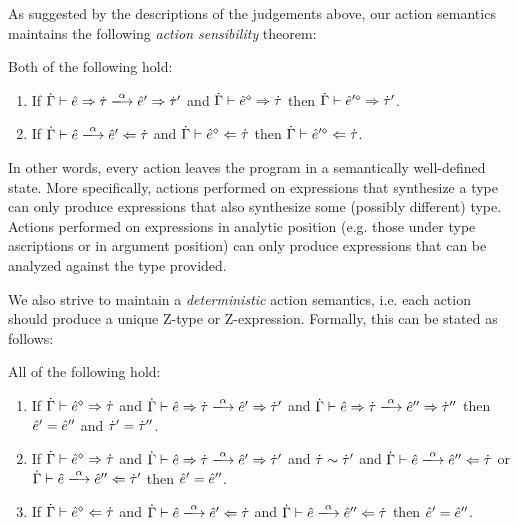 \documentclass{llncs}
\begin{document}
As suggested by the descriptions of the judgements above, our action semantics maintains the following \emph{action sensibility} theorem:
\begin{theorem} Both of the following hold:
\label{thrm:actsafe}
\begin{enumerate}
\item If $\performSyn{\hGamma}{\zexp}{\htau}{\alpha}{\zexp'}{\htau'}$ and $\dot{\Gamma} \vdash \hat{e}^{\diamond} \Rightarrow \dot{\tau}$ then $\dot{\Gamma} \vdash \hat{e}'^{\diamond} \Rightarrow \dot{\tau}'$.
\item If $\performAna{\hGamma}{\zexp}{\htau}{\alpha}{\zexp'}$ and $\dot{\Gamma} \vdash \hat{e}^{\diamond} \Leftarrow \dot{\tau}$ then $\dot{\Gamma} \vdash \hat{e}'^{\diamond} \Leftarrow \dot{\tau}$.
\end{enumerate}
\end{theorem}

In other words, every action leaves the program in a semantically well-defined state. More specifically, actions performed on expressions that synthesize a type can only produce expressions that also synthesize some (possibly different) type. Actions performed on expressions in analytic position (e.g. those under type ascriptions or in argument position) can only produce expressions that can be analyzed against the type provided.%

We also strive to maintain a \emph{deterministic} action semantics, i.e. each action should produce a unique Z-type or Z-expression. Formally, this can be stated as follows:
\begin{theorem} All of the following hold:
\label{thrm:actdet}
\begin{enumerate}
\item If $\dot{\Gamma} \vdash \hat{e}^{\diamond} \Rightarrow \dot{\tau}$ and $\performSyn{\hGamma}{\zexp}{\htau}{\alpha}{\zexp'}{\htau'}$ and $\performSyn{\hGamma}{\zexp}{\htau}{\alpha}{\zexp''}{\htau''}$ then $\hat{e}' = \hat{e}''$ and $\dot{\tau}' = \dot{\tau}''$.
\item If $\dot{\Gamma} \vdash \hat{e}^{\diamond} \Rightarrow \dot{\tau}$ and $\performSyn{\hGamma}{\zexp}{\htau}{\alpha}{\zexp'}{\htau'}$ and $\dot{\tau} \sim \dot{\tau}'$ and $\performAna{\hGamma}{\zexp}{\htau}{\alpha}{\zexp''}$ or $\performAna{\hGamma}{\zexp}{\htau'}{\alpha}{\zexp''}$ then $\hat{e}' = \hat{e}''$.
\item If $\dot{\Gamma} \vdash \hat{e}^{\diamond} \Leftarrow \dot{\tau}$ and $\performAna{\hGamma}{\zexp}{\htau}{\alpha}{\zexp'}$ and $\performAna{\hGamma}{\zexp}{\htau}{\alpha}{\zexp''}$ then $\hat{e}' = \hat{e}''$.
\end{enumerate}
\end{theorem}
\end{document}
